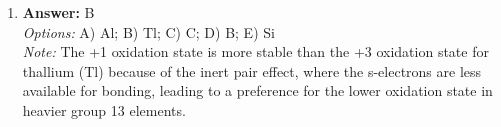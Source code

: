 \documentclass[12pt]{article}
\begin{document}
\begin{enumerate}[label=\arabic*.]
\\ \textit{Options:} A) $1.25 \times 10^3$ $\mathrm{K}$; B) $1.20 \times 10^3$ $\mathrm{K}$; C) $1.41 \times 10^3$ $\mathrm{K}$; D) $1.10 \times 10^3$ $\mathrm{K}$; E) $1.65 \times 10^3$ $\mathrm{K}$
\\ \textit{Note:} The correct answer of $1.41 \times 10^3$ $\mathrm{K}$ is derived from the van der Waals equation, which incorporates the specific parameters of chlorine to determine the temperature at which the gas behaves ideally, indicating the Boyle temperature.
\item \textbf{Answer:} B
\\ \textit{Options:} A) Al; B) Tl; C) C; D) B; E) Si
\\ \textit{Note:} The +1 oxidation state is more stable than the +3 oxidation state for thallium (Tl) because of the inert pair effect, where the s-electrons are less available for bonding, leading to a preference for the lower oxidation state in heavier group 13 elements.
\end{enumerate}
\end{document}
